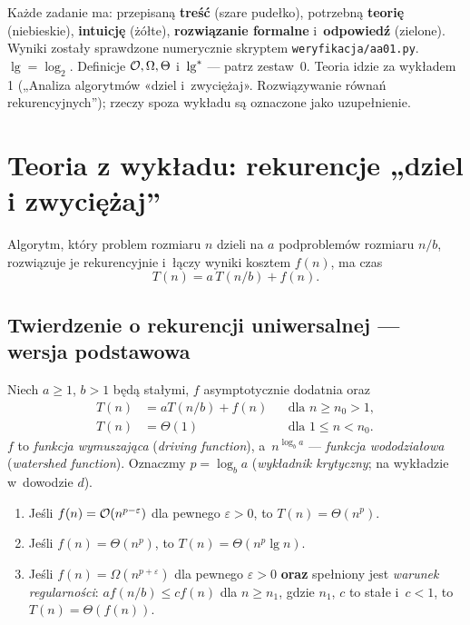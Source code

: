 \documentclass[11pt]{article}
\begin{document}

\begin{teoria}
Każde zadanie ma: przepisaną \textbf{treść} (szare pudełko), potrzebną
\textbf{teorię} (niebieskie), \textbf{intuicję} (żółte), \textbf{rozwiązanie
formalne} i~\textbf{odpowiedź} (zielone). Wyniki zostały sprawdzone
numerycznie skryptem \texttt{weryfikacja/aa01.py}. $\lg=\log_2$.
Definicje $\mathcal{O},\Omega,\Theta$ i~$\operatorname{lg}^{*}$ --- patrz zestaw~0.
Teoria idzie za wykładem 1 („Analiza algorytmów «dziel i~zwyciężaj».
Rozwiązywanie równań rekurencyjnych”); rzeczy spoza wykładu są oznaczone
jako uzupełnienie.
\end{teoria}

\section{Teoria z wykładu: rekurencje „dziel i zwyciężaj”}

Algorytm, który problem rozmiaru $n$ dzieli na $a$ podproblemów rozmiaru
$n/b$, rozwiązuje je rekurencyjnie i~łączy wyniki kosztem $f(n)$, ma czas
\[
T(n) = a\,T(n/b) + f(n).
\]

\subsection*{Twierdzenie o rekurencji uniwersalnej --- wersja podstawowa}

\begin{twierdzenie}\label{tw:master}
Niech $a\ge1$, $b>1$ będą stałymi, $f$ asymptotycznie dodatnia oraz
\begin{align*}
T(n)&=aT(n/b)+f(n)&&\text{dla }n\ge n_0>1,\\
T(n)&=\Theta(1)&&\text{dla }1\le n<n_0.
\end{align*}
$f$ to \emph{funkcja wymuszająca} (\emph{driving function}),
a~$n^{\log_ba}$ --- \emph{funkcja wododziałowa} (\emph{watershed function}).
Oznaczmy $p=\log_b a$ (\emph{wykładnik krytyczny}; na wykładzie w~dowodzie $d$).
\begin{enumerate}
\item Jeśli $f(n)=\mathcal{O}(n^{p-\varepsilon})$ dla pewnego $\varepsilon>0$, to $T(n)=\Theta(n^{p})$.
\item Jeśli $f(n)=\Theta(n^{p})$, to $T(n)=\Theta(n^{p}\lg n)$.
\item Jeśli $f(n)=\Omega(n^{p+\varepsilon})$ dla pewnego $\varepsilon>0$ \textbf{oraz} spełniony jest
\emph{warunek regularności}: $a f(n/b)\le c f(n)$ dla $n\ge n_1$, gdzie $n_1$, $c$
to stałe i~$c<1$, to $T(n)=\Theta(f(n))$.
\end{enumerate}
\end{twierdzenie}
\end{document}
